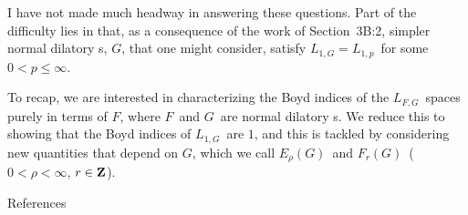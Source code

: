 I have not made much headway in answering these questions. Part of the
difficulty lies in that, as a consequence
of the work of Section~3B:2, simpler
normal dilatory \af s, $G$, that one might
consider, satisfy $L_{1,G} = L_{1,p}$\
for some $0<p\le \infty$.
 
\bigskip
To recap, we are interested in characterizing the Boyd indices of the
$L_{F,G}$\ spaces purely in terms of $F$,
where $F$\ and $G$\ are normal dilatory
\af s. We reduce this to showing that
the Boyd indices of $L_{1,G}$\ are $1$,
and
this is tackled by considering new quantities that depend on $G$, which we
call $E_\rho(G)$\ and $F_r(G)$\ ($0<\rho<\infty$, $r\in{\bf Z}$).
 
\vfill
\eject
 
\frenchspacing
 
\beginsection References
 
